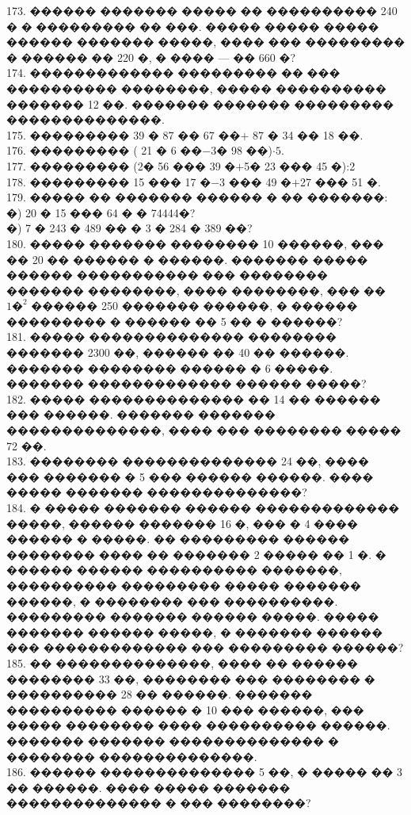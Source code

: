 \documentclass[12pt]{article}
\begin{document}
173. ������ ������� ����� �� ���������� 240 � � ��������� �� ���. ����� ����� ����� ������ ������� �����, ���� ��� ��������� � ������ �� 220 �, � ���� --- �� 660 �?\\
174. ������������� ��������� �� ��� ���������� ��������, ����� ���������� ������� 12 ��. ������� ������� ��������� ��������������.\\
175. ��������� 39 � 87 �� 67 ��$+$ 87 � 34 �� 18 ��.\\
176. ��������� ( 21 � 6 ��$-$3� 98 ��)$\cdot5.$\\
177. ��������� (2� 56 ��� 39 �$+$5� 23 ��� 45 �):2\\
178. ��������� 15 ��� 17 �$-$3 ��� 49 �$+$27 ��� 51 �.\\
179. ����� �� ������� ������ � �� �������:\\
�) 20 � 15 ��� 64 � � 74444�?\\
�) 7 � 243 � 489 �� � 3 � 284 � 389 ��?\\
180. ����� ������� �������� 10 ������, ��� �� 20 �� ������ � ������. ������� ����� ������ ����������� ��� �������� ������� ��������, ���� ��������, ��� �� $1\text{�}^2$ ������ 250 ������� ������, � ������ ��������� � ������ �� 5 �� � ������?\\
181. ����� �������������� �������� ������� 2300 ��, ������ �� 40 �� ������. ������� �������� ������ � 6 �����. ������� ������������� ������ �����?\\
182. ����� �������������� �� 14 �� ������ ��� ������. ������� ������� ��������������, ���� ��� �������� ����� 72 ��.\\
183. �������� �������������� 24 ��, ���� ��� ������� � 5 ��� ������ ������. ���� ����� ������� ��������������?\\
184. � ����� ������� ������ ������������� �����, ������ ������� 16 �, ��� � 4 ���� ������ � �����. �� ��������� ������ �������� ���� ��  ������� 2 ����� �� 1 �. � ������ ������ ���������� �������, ���������� ��������� ����� ������� ������, � �������� ��� ����������. ��������� ������� ������ �����. ����� ������� ������ �����, � ������� ������ ��� ������������� ��� ��������� ������?\\
185. �� ��������������, ���� �� ������ �������� 33 ��, �������� ��� �������� � ���������� 28 �� ������. ������� ���������� ������ � 10 ��� ������, ��� ����� �������� ���� ���������� ������. ������� ������� �������������� � �������� ��������������.\\
186. ������ �������������� 5 ��, � ����� �� 3 �� ������. ���� ����� ������� �������������� � ��� ��������?\\
\end{document}
